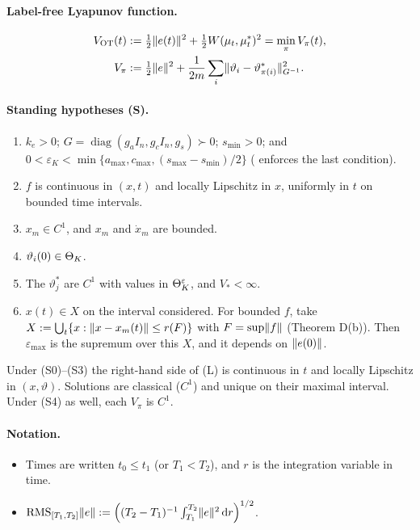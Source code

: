 \paragraph{Label-free Lyapunov function.}
\begin{align*}
  V_{\mathrm{OT}}(t) &:= \tfrac12\lVert e(t)\rVert^2 + \tfrac12 W(\mu_t,\mu^*_t)^2 = \min_\pi V_\pi(t),\\
  V_\pi &:= \tfrac12\lVert e\rVert^2 + \frac1{2m}\sum_i\lVert \vartheta_i-\vartheta^*_{\pi(i)}\rVert_{G^{-1}}^2 .
\end{align*}

\paragraph{Standing hypotheses (S).}
\begin{enumerate}[label=(S\arabic*),start=0]
  \item $k_e>0$; $G = \operatorname{diag}(g_a I_n, g_c I_n, g_s)\succ 0$; $s_{\min}>0$; and
    $0<\varepsilon_K<\min\{a_{\max},c_{\max},(s_{\max}-s_{\min})/2\}$ ( enforces the
    last condition).
  \item $f$ is continuous in $(x,t)$ and locally Lipschitz in $x$, uniformly in $t$ on bounded time intervals.
  \item $x_m\in C^1$, and $x_m$ and $\dot x_m$ are bounded.
  \item $\vartheta_i(0)\in\Theta_K$.
  \item The $\vartheta^*_j$ are $C^1$ with values in $\Theta_K^{\varepsilon}$, and $V_*<\infty$.
  \item $x(t)\in X$ on the interval considered. For bounded $f$, take
    $X := \bigcup_t\{x : \lVert x-x_m(t)\rVert\le r(F)\}$ with $F = \sup\lVert f\rVert$ (Theorem D(b)). Then $\varepsilon_{\max}$
    is the supremum over this $X$, and it depends on $\lVert e(0)\rVert$.
\end{enumerate}
Under (S0)--(S3) the right-hand side of (L) is continuous in $t$ and locally Lipschitz in $(x,\vartheta)$. Solutions
are classical ($C^1$) and unique on their maximal interval. Under (S4) as well, each $V_\pi$ is $C^1$.

\paragraph{Notation.}
\begin{itemize}
  \item Times are written $t_0\le t_1$ (or $T_1<T_2$), and $r$ is the integration variable in time.
  \item $\operatorname{RMS}_{[T_1,T_2]}\lVert e\rVert := \Bigl((T_2-T_1)^{-1}\int_{T_1}^{T_2}\lVert e\rVert^2\,\mathrm{d} r\Bigr)^{1/2}$.
\end{itemize}

